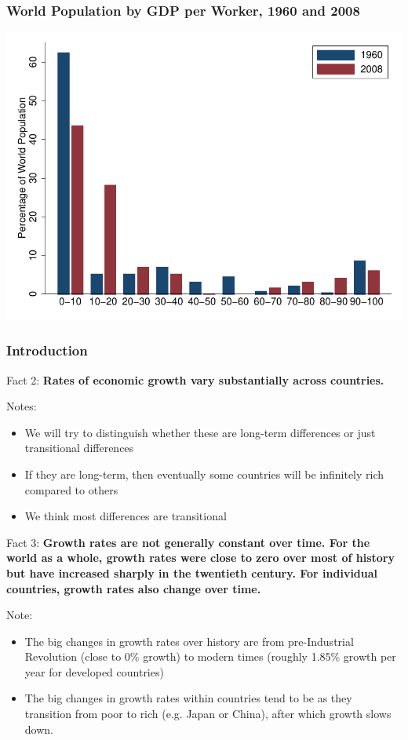 \documentclass[shownotes,11pt, aspectratio=169]{beamer}
\begin{document}
\begin{frame}
\frametitle{World Population by GDP per Worker, 1960 and 2008}
\begin{center}
\includegraphics[scale=0.8]{graphs/figure_1_2.pdf}
\end{center}
\end{frame}

\begin{frame}
\frametitle{Introduction}
Fact 2: \textbf{Rates of economic growth vary substantially across countries.}

\vspace{.25in}\noindent Notes:
\begin{itemize}
	\item We will try to distinguish whether these are long-term differences or just transitional differences
	\item If they are long-term, then eventually some countries will be infinitely rich compared to others
	\item We think most differences are transitional
\end{itemize}
\end{frame}

\begin{frame}
Fact 3: \textbf{Growth rates are not generally constant over time. For the world as a whole, growth rates were close to zero over most of history but have increased sharply in the twentieth century. For individual countries, growth rates also change over time.}

\vspace{.25in}\noindent Note:
\begin{itemize}
	\item The big changes in growth rates over history are from pre-Industrial Revolution (close to 0\% growth) to modern times (roughly 1.85\% growth per year for developed countries)
	\item The big changes in growth rates within countries tend to be as they transition from poor to rich (e.g. Japan or China), after which growth slows down.
\end{itemize}
\end{frame}
\end{document}
